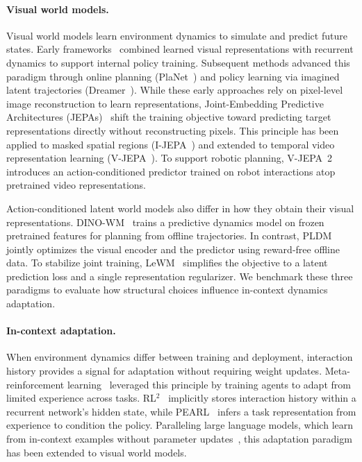 \paragraph{Visual world models.}
Visual world models learn environment dynamics to simulate and predict future states.
Early frameworks~\cite{ha2018worldmodels} combined learned visual representations with recurrent dynamics to support internal policy training.
Subsequent methods advanced this paradigm through online planning (PlaNet~\cite{hafner2019planet}) and policy learning via imagined latent trajectories (Dreamer~\cite{hafner2020dreamer}).
While these early approaches rely on pixel-level image reconstruction to learn representations, Joint-Embedding Predictive Architectures (JEPAs)~\cite{lecun2022path} shift the training objective toward predicting target representations directly without reconstructing pixels.
This principle has been applied to masked spatial regions (I-JEPA~\cite{assran2023ijepa}) and extended to temporal video representation learning (V-JEPA~\cite{bardes2024vjepa}).
To support robotic planning, V-JEPA~2~\cite{assran2025vjepa2} introduces an action-conditioned predictor trained on robot interactions atop pretrained video representations.

Action-conditioned latent world models also differ in how they obtain their visual representations.
DINO-WM~\cite{zhou2025dinowm} trains a predictive dynamics model on frozen pretrained features for planning from offline trajectories.
In contrast, PLDM~\cite{sobal2025pldm} jointly optimizes the visual encoder and the predictor using reward-free offline data.
To stabilize joint training, LeWM~\cite{maes2026leworldmodel} simplifies the objective to a latent prediction loss and a single representation regularizer.
We benchmark these three paradigms to evaluate how structural choices influence in-context dynamics adaptation.

\paragraph{In-context adaptation.}
When environment dynamics differ between training and deployment, interaction history provides a signal for adaptation without requiring weight updates.
Meta-reinforcement learning~\cite{beck2025metarl} leveraged this principle by training agents to adapt from limited experience across tasks.
RL$^2$~\cite{duan2016rl2} implicitly stores interaction history within a recurrent network's hidden state, while PEARL~\cite{rakelly2019pearl} infers a task representation from experience to condition the policy.
Paralleling large language models, which learn from in-context examples without parameter updates~\cite{brown2020fewshot,dong2024icl}, this adaptation paradigm has been extended to visual world models.

